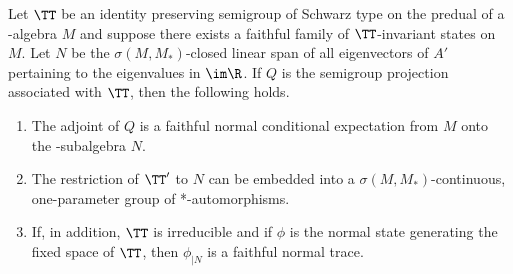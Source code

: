 \begin{theorem}\label{thm:d4-3.5}
Let $\TT$ be an identity preserving semigroup of Schwarz type on the predual of a \WA-algebra $M$ and suppose there exists a faithful family of\/ $\TT$-invariant states on $M$.
Let $N$ be the $\sigma(M,M_{*})$-closed linear span of all eigenvectors of\/ $A'$ pertaining to the eigenvalues in $\im\R$.
If\/ $Q$ is the semigroup projection associated with $\TT$, then the following holds.
\begin{enumerate}[\upshape (i)]
\item 
The adjoint of\/ $Q$ is a faithful normal conditional expectation from $M$ onto the \WA-subalgebra $N$.

\item 
The restriction of\/ $\TT'$ to $N$ can be embedded into a $\sigma(M,M_{*})$-continuous, one-parameter group of *-automorphisms.

\item 
If, in addition, $\TT$ is irreducible and if\/ $\phi$ is the normal state generating the fixed space of\/ $\TT$, then $\phi_{\vert N}$ is a faithful normal trace.

\end{enumerate}
\end{theorem}
